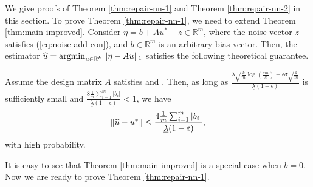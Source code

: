 We give proofs of Theorem \ref{thm:repair-nn-1} and Theorem \ref{thm:repair-nn-2} in this section.
To prove Theorem \ref{thm:repair-nn-1}, we need to extend Theorem \ref{thm:main-improved}. Consider $\eta=b+Au^*+z\in\mathbb{R}^m$, where the noise vector $z$ satisfies (\ref{eq:noise-add-con}), and $b\in\mathbb{R}^m$ is an arbitrary bias vector. Then, the estimator $\widehat{u}=\mathop{\rm argmin}_{u\in\mathbb{R}^k}\|\eta-Au\|_1$ satisfies the following theoretical guarantee.
\begin{thm}\label{thm:robust-reg-b}
Assume the design matrix $A$ satisfies \conditionA{} and \conditionB. Then, as long as $\frac{\overline{\lambda}\sqrt{\frac{k}{m}\log\left(\frac{em}{k}\right)}+\epsilon\sigma\sqrt{\frac{k}{m}}}{\underline{\lambda}(1-\epsilon)}$ is sufficiently small and $\frac{8\frac{1}{m}\sum_{i=1}^m|b_i|}{\underline{\lambda}(1-\epsilon)}<1$, we have
$$\|\widehat{u}-u^*\|\leq \frac{4\frac{1}{m}\sum_{i=1}^m|b_i|}{\underline{\lambda}(1-\varepsilon)},$$
with high probability.
\end{thm}
It is easy to see that Theorem \ref{thm:main-improved} is a special case when $b=0$.
Now we are ready to prove Theorem \ref{thm:repair-nn-1}.
